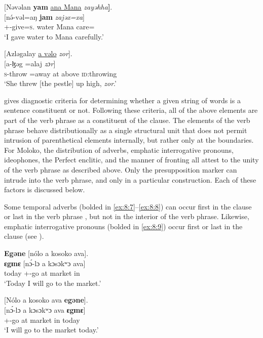 \ea \label{ex:8:5}
{}[Nəvəlan  \textbf{yam}  \underline{ana  Mana}  \textit{zayəhha}\textbf{]}.\\
\gll \textup{[}n\'{ə}-vəl=aŋ    \textbf{jam}      \textit{zajəx=xa}\textup{]}\\
{\oneS}+{\PFV}-give=\textsc{s}.{\IO}  water  {\DAT} Mana  care={\ADV}\\
\glt ‘I gave water to Mana carefully.’
\z

\ea \label{ex:8:6}
{}[Azləgalay \underline{a  vəlo} \textit{zor}].\\
\gll {}[a-ɮəg =alaj    \textit{zɔr}]\\
\textsc{s}-throw =away    at  above  \textsc{id}:throwing\\
\glt ‘She threw [the pestle] up high, \textit{zor}.’
\z

\citet[69]{Radford1981} gives diagnostic criteria for determining whether a given string of words is a sentence constituent or not. Following these criteria, all of the above elements are part of the verb phrase as a constituent of the clause. The elements of the verb phrase behave distributionally as a single structural unit that does not permit intrusion of parenthetical elements internally, but rather only at the boundaries. For Moloko, the distribution of adverbs, emphatic interrogative pronouns, ideophones, the Perfect enclitic, and the manner of fronting all attest to the unity of the verb phrase as described above. Only the presupposition marker can intrude into the verb phrase, and only in a particular construction. Each of these factors is discussed below. 

Some temporal adverbs (bolded in \ref{ex:8:7}--\ref{ex:8:8}) can occur first in the clause or last in the verb phrase , but not in the interior of the verb phrase. Likewise, emphatic interrogative pronouns (bolded in \ref{ex:8:9}) occur first or last in the clause (see ). 

\ea \label{ex:8:7}
\textbf{Egəne}  [nólo  a  kosoko  ava].\\
\gll  \textbf{ɛgɪnɛ}  [n\'{ɔ}-lɔ     a  kɔsɔkʷɔ  ava]\\
      today  {\oneS}+{\IFV}-go  at  market  in\\
\glt  ‘Today I will go to the market.'
\z

\ea \label{ex:8:8}
{}[Nólo  a  kosoko  ava  \textbf{egəne}].\\
\gll  {}[n\'ɔ-lɔ   a  kɔsɔkʷɔ  ava  \textbf{ɛgɪnɛ}]\\
      {\oneS}+{\IFV}-go  at  market  in  today\\
\glt  ‘I will go to the market today.'
\z

